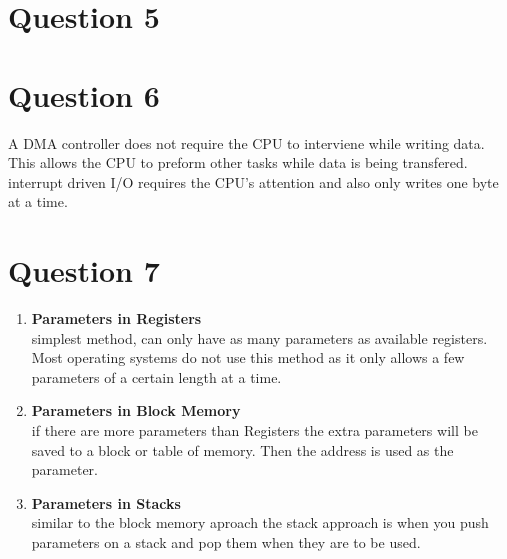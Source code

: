 \documentclass[11pt]{article}
\begin{document}
\section*{Question 5}

\section*{Question 6}
A DMA controller does not require the CPU to 
interviene while writing data. This allows the 
CPU to preform other tasks while data is being
transfered. interrupt driven I/O requires the 
CPU's attention and also only writes one byte at
a time.

\section*{Question 7}
\begin{enumerate}
\item \textbf{Parameters in Registers}\\
simplest method, can only have as many 
parameters as available registers. Most 
operating systems do not use this method as 
it only allows a few parameters of a certain
length at a time.

\item \textbf{Parameters in Block Memory}\\
if there are more parameters than Registers
the extra parameters will be saved to a block or 
table of memory. Then the address is used as the 
parameter.

\item \textbf{Parameters in Stacks}\\
similar to the block memory aproach the
stack approach is when you push parameters on
a stack and pop them when they are to be used.

\end{enumerate}
\end{document}
